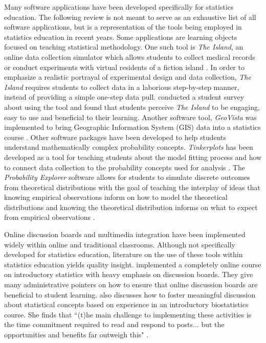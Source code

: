 Many software applications have been developed specifically for statistics education. The following review is not meant to serve as an exhaustive list of all software applications, but is a representation of the tools being employed in statistics education in recent years. Some applications are learning objects focused on teaching statistical methodology. One such tool is \textit{The Island}, an online data collection simulator which allows students to collect medical records or conduct experiments with virtual residents of a fiction island \citep{Bulmer2011}. In order to emphasize a realistic portrayal of experimental design and data collection, \textit{The Island} requires students to collect data in a laborious step-by-step manner, instead of providing a simple one-step data pull. \citet{BaglinBedfordBulmer2013} conducted a student survey about using the tool and found that students perceive \textit{The Island} to be engaging, easy to use and beneficial to their learning. Another software tool, \textit{GeoVista} was implemented to bring Geographic Information System (GIS) data into a statistics course \citep{Forbes2012}. Other software packages have been developed to help students understand mathematically complex probability concepts. \textit{Tinkerplots} has been developed as a tool for teaching students about the model fitting process and how to connect data collection to the probability concepts used for analysis \citep{Konold2008}. The \textit{Probability Explorer} software allows for students to simulate discrete outcomes from theoretical distributions with the goal of teaching the interplay of ideas that knowing empirical observations inform on how to model the theoretical distributions and knowing the theoretical distribution informs on what to expect from empirical observations \citep{Lee2009}.

Online discussion boards and multimedia integration have been implemented widely within online and traditional classrooms. Although not specifically developed for statistics education, literature on the use of these tools within statistics education yields quality insight. \citet{Everson2008} implemented a completely online course on introductory statistics with heavy emphasis on discussion boards. They give many administrative pointers on how to ensure that online discussion boards are beneficial to student learning. \citet{Schmidt2013} also discusses how to foster meaningful discussion about statistical concepts based on experience in an introductory biostatistics course.  She finds that ``(t)he main challenge to implementing these activities is the time commitment required to read and respond to posts... but the opportunities and benefits far outweigh this"  \citep[p.9]{Schmidt2013}. 

